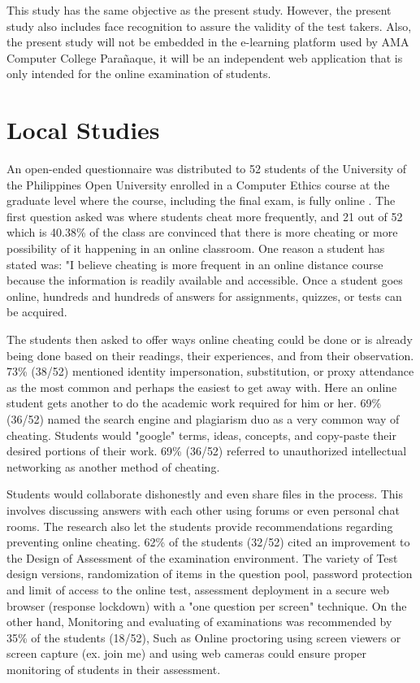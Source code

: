 This study has the same objective as the present study. However, the present study also includes face recognition to assure the validity of the test takers.
Also, the present study will not be embedded in the e-learning platform used by AMA Computer College Parañaque, it will be an independent web application that is only intended for the online examination of students.

\section{Local Studies}

An open-ended questionnaire was distributed to 52 students of the University of the Philippines Open University enrolled in a Computer Ethics course at the graduate level where the course, including the final exam, is fully online \cite{ravasco2012technology}.
The first question asked was where students cheat more frequently, and 21 out of 52 which is 40.38\% of the class are convinced that there is more cheating or more possibility of it happening in an online classroom.
One reason a student has stated was: "I believe cheating is more frequent in an online distance course because the information is readily available and accessible.
Once a student goes online, hundreds and hundreds of answers for assignments, quizzes, or tests can be acquired.

The students then asked to offer ways online cheating could be done or is already being done based on their readings, their experiences, and from their observation.
73\% (38/52) mentioned identity impersonation, substitution, or proxy attendance as the most common and perhaps the easiest to get away with.
Here an online student gets another to do the academic work required for him or her.
69\% (36/52) named the search engine and plagiarism duo as a very common way of cheating.
Students would "google" terms, ideas, concepts, and copy-paste their desired portions of their work.
69\% (36/52) referred to unauthorized intellectual networking as another method of cheating.

Students would collaborate dishonestly and even share files in the process.
This involves discussing answers with each other using forums or even personal chat rooms.
The research also let the students provide recommendations regarding preventing online cheating.
62\% of the students (32/52) cited an improvement to the Design of Assessment of the examination environment.
The variety of Test design versions, randomization of items in the question pool, password protection and limit of access to the online test, assessment deployment in a secure web browser (response lockdown) with a "one question per screen" technique.
On the other hand, Monitoring and evaluating of examinations was recommended by 35\% of the students (18/52), Such as Online proctoring using screen viewers or screen capture (ex. join me) and using web cameras could ensure proper monitoring of students in their assessment.


